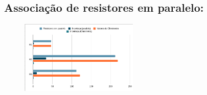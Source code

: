 \documentclass{article}
\begin{document}
\begin{center}
      \subsection{Associação de resistores em paralelo:}

      \begin{figure}[h]
        \centering
        \includegraphics[width=0.5\textwidth]{Associação de resistores em paralelo.png}
      \end{figure}

\end{center}
\end{document}
